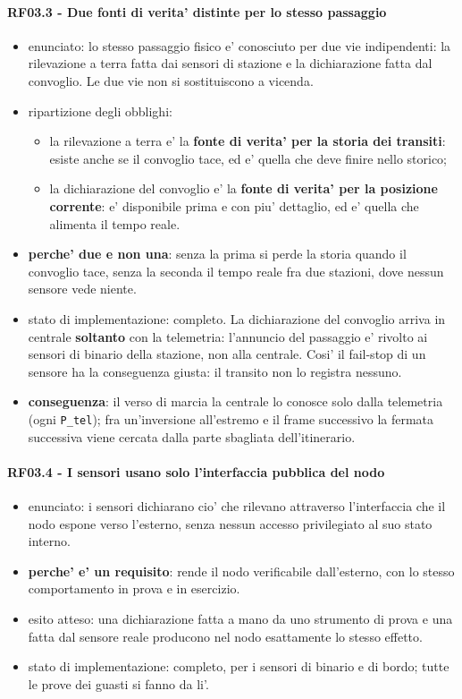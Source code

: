 \documentclass[11pt]{article}
\begin{document}
\paragraph{RF03.3 - Due fonti di verita' distinte per lo stesso passaggio}
\label{sec:orgc07b05d}
\begin{itemize}
\item enunciato: lo stesso passaggio fisico e' conosciuto per due vie indipendenti: la rilevazione a
terra fatta dai sensori di stazione e la dichiarazione fatta dal convoglio. Le due vie non si
sostituiscono a vicenda.
\item ripartizione degli obblighi:
\begin{itemize}
\item la rilevazione a terra e' la \textbf{fonte di verita' per la storia dei transiti}: esiste anche se il
convoglio tace, ed e' quella che deve finire nello storico;
\item la dichiarazione del convoglio e' la \textbf{fonte di verita' per la posizione corrente}: e' disponibile
prima e con piu' dettaglio, ed e' quella che alimenta il tempo reale.
\end{itemize}
\item \textbf{perche' due e non una}: senza la prima si perde la storia quando il convoglio tace, senza la
seconda il tempo reale fra due stazioni, dove nessun sensore vede niente.
\item stato di implementazione: completo. La dichiarazione del convoglio arriva in centrale \textbf{soltanto}
con la telemetria: l'annuncio del passaggio e' rivolto ai sensori di binario della stazione, non
alla centrale. Cosi' il fail-stop di un sensore ha la conseguenza giusta: il transito non lo
registra nessuno.
\item \textbf{conseguenza}: il verso di marcia la centrale lo conosce solo dalla telemetria (ogni \texttt{P\_tel}); fra
un'inversione all'estremo e il frame successivo la fermata successiva viene cercata dalla parte
sbagliata dell'itinerario.
\end{itemize}
\paragraph{RF03.4 - I sensori usano solo l'interfaccia pubblica del nodo}
\label{sec:org1e09f16}
\begin{itemize}
\item enunciato: i sensori dichiarano cio' che rilevano attraverso l'interfaccia che il nodo espone
verso l'esterno, senza nessun accesso privilegiato al suo stato interno.
\item \textbf{perche' e' un requisito}: rende il nodo verificabile dall'esterno, con lo stesso comportamento
in prova e in esercizio.
\item esito atteso: una dichiarazione fatta a mano da uno strumento di prova e una fatta dal sensore reale
producono nel nodo esattamente lo stesso effetto.
\item stato di implementazione: completo, per i sensori di binario e di bordo; tutte le prove dei
guasti si fanno da li'.
\end{itemize}
\end{document}
